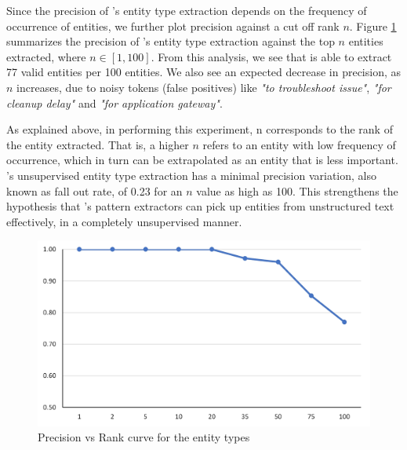 Since the precision of \softner{}'s entity type extraction depends on the frequency of occurrence of entities, we further plot precision against a cut off rank $n$. Figure \ref{pattern-extraction} summarizes the precision of \softner{}'s entity type extraction against the top $n$ entities extracted, where $n \in [1,100]$. From this analysis, we see that \softner{} is able to extract 77 valid entities per 100 entities. We also see an expected decrease in precision, as $n$ increases, due to noisy tokens (false positives) like \textit{"to troubleshoot issue"}, \textit{"for cleanup delay"} and \textit{"for application gateway"}.

As explained above, in performing this experiment, n corresponds to the rank of the entity extracted. That is, a higher $n$ refers to an entity with low frequency of occurrence, which in turn can be extrapolated as an entity that is less important. \softner{}'s unsupervised entity type extraction has a minimal precision variation, also known as fall out rate, of 0.23 for an $n$ value as high as 100. This strengthens the hypothesis that \softner{}'s pattern extractors can pick up entities from unstructured text effectively, in a completely unsupervised manner.  

\begin{figure}%
\includegraphics[width=\linewidth]{Figures/pattern_extraction_eval.jpg}
\caption{Precision vs Rank curve for the entity types}
\label{pattern-extraction}
\end{figure}

